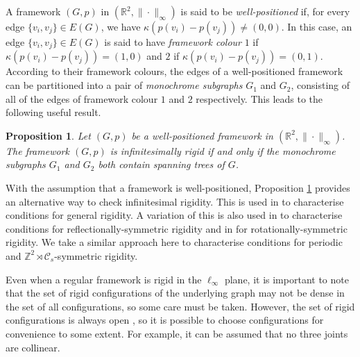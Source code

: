 \documentclass[reqno,a4paper,10pt]{article}
\newtheorem{proposition}[theorem]{Proposition}
\theoremstyle{definition}
\theoremstyle{remark}
\numberwithin{equation}{section}
\numberwithin{figure}{section}
\numberwithin{table}{section}
\newcommand{\R}{\mathbb{R}}
\newcommand{\Z}{\mathbb{Z}}
\begin{document}
    A framework $(G,p)$ in $(\R^2,\|\cdot\|_\infty)$ is said to be \emph{well-positioned} if, for every edge $\{v_i,v_j\}\in E(G)$, we have $\kappa(p(v_i)-p(v_j))\neq(0,0)$. In this case, an edge $\{v_i,v_j\}\in E(G)$ is said to have \emph{framework colour} $1$ if $\kappa(p(v_i)-p(v_j))=(1,0)$ and $2$ if $\kappa(p(v_i)-p(v_j))=(0,1)$. According to their framework colours, the edges of a well-positioned framework can be partitioned into a pair of \emph{monochrome subgraphs} $G_1$ and $G_2$, consisting of all of the edges of framework colour $1$ and $2$ respectively. This leads to the following useful result.
    \begin{proposition}\label{MonochromeEquivalence}\cite[Propositions 4.3 and 4.4]{NonEuclidean}
        Let $(G,p)$ be a well-positioned framework in $(\R^2,\|\cdot\|_\infty)$. The framework $(G,p)$ is infinitesimally rigid if and only if the monochrome subgraphs $G_1$ and $G_2$ both contain spanning trees of $G$.
    \end{proposition}
    With the assumption that a framework is well-positioned, Proposition \ref{MonochromeEquivalence} provides an alternative way to check infinitesimal rigidity. This is used in \cite{NonEuclidean} to characterise conditions for general rigidity. A variation of this is also used in \cite{GridLike} to characterise conditions for reflectionally-symmetric rigidity and in \cite{KitsonSymmetricNormed} for rotationally-symmetric rigidity. We take a similar approach here to characterise conditions for periodic and $\Z^2\rtimes\mathcal{C}_s$-symmetric rigidity.

    Even when a regular framework is rigid in the $\ell_\infty$ plane, it is important to note that the set of rigid configurations of the underlying graph may not be dense in the set of all configurations, so some care must be taken. However, the set of rigid configurations is always open \cite{DewarDCG21}, so it is possible to choose configurations for convenience to some extent. For example, it can be assumed that no three joints are collinear.
\end{document}
